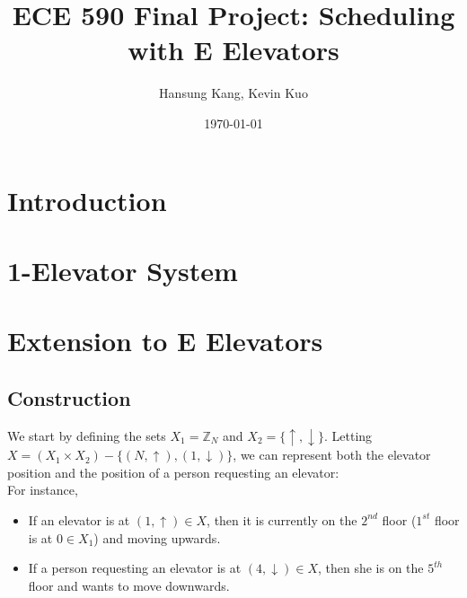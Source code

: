 \documentclass[letterpaper]{article} %
\begin{document}
\title{ECE 590 Final Project: Scheduling with E Elevators}
\author{Hansung Kang, Kevin Kuo}
\date{\today}
\maketitle

\section{Introduction}

\section{1-Elevator System}

\section{Extension to E Elevators}
\subsection{Construction}
We start by defining the sets $X_1 = \mathbb{Z}_N$ and $X_2 = \{\uparrow, \downarrow\}$. Letting $X = (X_1 \times X_2) - \{(N, \uparrow), (1, \downarrow)\}$, we can represent both the elevator position and the position of a person requesting an elevator:\\

For instance, 
\begin{itemize}
	\item If an elevator is at $(1, \uparrow) \in X$, then it is currently on the $2^{nd}$ floor ($1^{st}$ floor is at $0 \in X_1$) and moving upwards.
	\item If a person requesting an elevator is at $(4, \downarrow) \in X$, then she is on the $5^{th}$ floor and wants to move downwards. 
\end{itemize}
\end{document}

